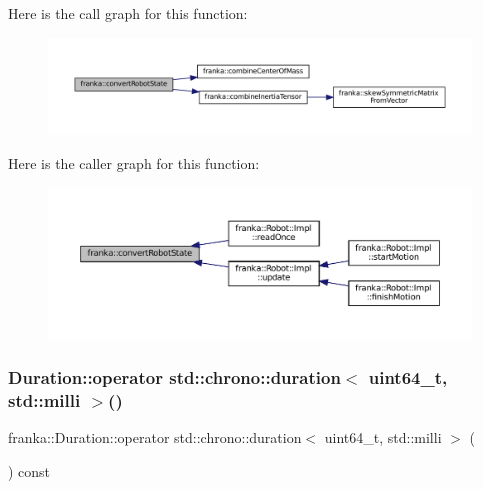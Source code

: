Here is the call graph for this function\+:
\nopagebreak
\begin{figure}[H]
\begin{center}
\leavevmode
\includegraphics[width=350pt]{namespacefranka_a0eaee201f8afdb02f6530269cb581cbb_cgraph}
\end{center}
\end{figure}
Here is the caller graph for this function\+:
\nopagebreak
\begin{figure}[H]
\begin{center}
\leavevmode
\includegraphics[width=350pt]{namespacefranka_a0eaee201f8afdb02f6530269cb581cbb_icgraph}
\end{center}
\end{figure}
\mbox{\label{namespacefranka_af66b76866e831af19875a3d66f24da49}} 
\subsubsection{\texorpdfstring{Duration\+::operator std\+::chrono\+::duration$<$ uint64\+\_\+t, std\+::milli $>$()}{Duration::operator std::chrono::duration< uint64\_t, std::milli >()}}
{\footnotesize\ttfamily franka\+::\+Duration\+::operator std\+::chrono\+::duration$<$ uint64\+\_\+t, std\+::milli $>$ (\begin{DoxyParamCaption}{ }\end{DoxyParamCaption}) const\hspace{0.3cm}{\ttfamily [noexcept]}}



